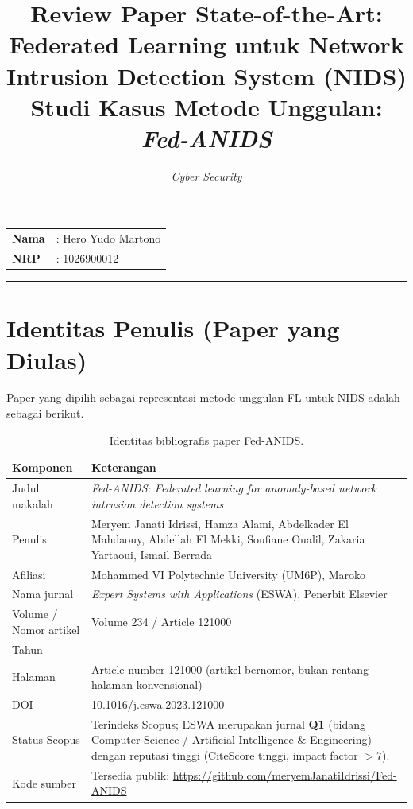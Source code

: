 \documentclass[11pt,a4paper]{article}
\title{\textbf{Review Paper State-of-the-Art:\\
Federated Learning untuk Network Intrusion Detection System (NIDS)}\\[4pt]
\large Studi Kasus Metode Unggulan: \textit{Fed-ANIDS}}
\author{\textit{Cyber Security}}
\date{}
\begin{document}
\maketitle

\begin{center}
\begin{tabular}{@{}ll@{}}
\textbf{Nama} & : Hero Yudo Martono \\
\textbf{NRP}  & : 1026900012 \\
\end{tabular}
\end{center}
\vspace{0.5em}
\hrule
\vspace{1em}

\section{Identitas Penulis (Paper yang Diulas)}

Paper yang dipilih sebagai representasi metode unggulan FL untuk NIDS adalah
sebagai berikut.

\begin{table}[h]
\centering
\renewcommand{\arraystretch}{1.35}
\begin{tabular}{@{}>{\raggedright\arraybackslash}p{4.2cm}>{\raggedright\arraybackslash}p{9.5cm}@{}}
\toprule
\textbf{Komponen} & \textbf{Keterangan} \\
\midrule
Judul makalah &
\textit{Fed-ANIDS: Federated learning for anomaly-based network intrusion
detection systems} \\
Penulis &
Meryem Janati Idrissi, Hamza Alami, Abdelkader El Mahdaouy, Abdellah El Mekki,
Soufiane Oualil, Zakaria Yartaoui, Ismail Berrada \\
Afiliasi &
Mohammed VI Polytechnic University (UM6P), Maroko \\
Nama jurnal &
\textit{Expert Systems with Applications} (ESWA), Penerbit Elsevier \\
Volume / Nomor artikel &
Volume 234 / Article 121000 \\
Tahun &
2023 \\
Halaman &
Article number 121000 (artikel bernomor, bukan rentang halaman konvensional) \\
DOI &
\href{https://doi.org/10.1016/j.eswa.2023.121000}{10.1016/j.eswa.2023.121000} \\
Status Scopus &
Terindeks Scopus; ESWA merupakan jurnal \textbf{Q1} (bidang Computer Science /
Artificial Intelligence \& Engineering) dengan reputasi tinggi (CiteScore
tinggi, impact factor $>7$). \\
Kode sumber &
Tersedia publik: \url{https://github.com/meryemJanatiIdrissi/Fed-ANIDS} \\
\bottomrule
\end{tabular}
\caption{Identitas bibliografis paper Fed-ANIDS.}
\end{table}
\end{document}
